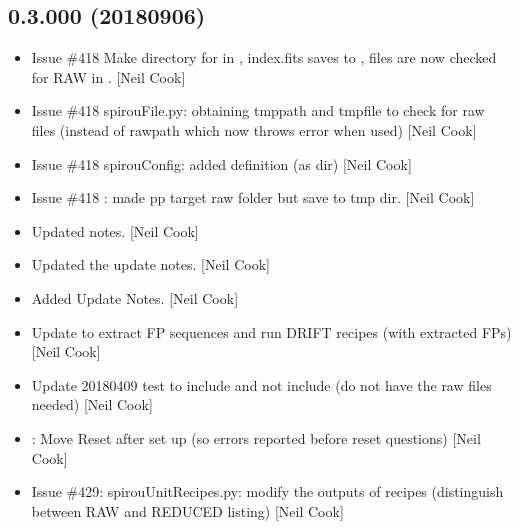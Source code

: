 \documentclass[a4paper,10pt,english]{report}
\begin{document}
\subsection{0.3.000 (2018\sphinxhyphen{}09\sphinxhyphen{}06)}
\label{\detokenize{misc/changelog:id352}}\begin{itemize}
\item {} 
Issue \#418  \sphinxhyphen{} Make directory for  in
, index.fits saves to , files are now checked for RAW in
. {[}Neil Cook{]}

\item {} 
Issue \#418 spirouFile.py: obtaining tmppath and tmpfile to check for
raw files (instead of rawpath which now throws error when used) {[}Neil
Cook{]}

\item {} 
Issue \#418 spirouConfig: added  definition (as 
dir) {[}Neil Cook{]}

\item {} 
Issue \#418 : made pp target raw folder but
save to tmp dir. {[}Neil Cook{]}

\item {} 
Updated notes. {[}Neil Cook{]}

\item {} 
Updated the update notes. {[}Neil Cook{]}

\item {} 
Added Update Notes. {[}Neil Cook{]}

\item {} 
Update  to extract FP sequences and run DRIFT
recipes (with extracted FPs) {[}Neil Cook{]}

\item {} 
Update 20180409 test to include  and not include
 (do not have the raw files needed) {[}Neil Cook{]}

\item {} 
: Move Reset after set up (so errors reported before reset
questions) {[}Neil Cook{]}

\item {} 
Issue \#429: spirouUnitRecipes.py: modify the outputs of 
recipes (distinguish between RAW and REDUCED listing) {[}Neil Cook{]}


\end{itemize}
\end{document}
